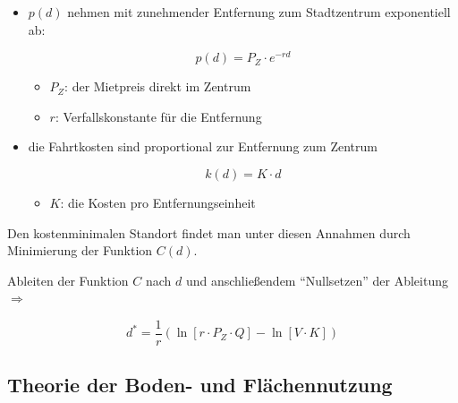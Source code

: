       \begin{itemize}
        \setlength{\itemsep}{1pt}
        \setlength{\parskip}{0pt}
        \setlength{\parsep}{0pt}
        \item $p(d)$ nehmen mit zunehmender Entfernung zum Stadtzentrum exponentiell ab:
          
          \begin{equation}
            p(d) = P_Z \cdot e^{-rd}
          \end{equation}

          \begin{itemize}
            \item $P_Z$: der Mietpreis direkt im Zentrum
            \item $r$: Verfallskonstante für die Entfernung
          \end{itemize}

        \item die Fahrtkosten sind proportional zur Entfernung zum Zentrum

          \begin{equation}
            k(d) = K \cdot d
          \end{equation}

          \begin{itemize}
            \item $K$: die Kosten pro Entfernungseinheit
          \end{itemize}
      \end{itemize}

      \par Den kostenminimalen Standort findet man unter diesen Annahmen durch Minimierung der Funktion $C(d)$.

      \par Ableiten der Funktion $C$ nach $d$ und anschließendem ``Nullsetzen'' der Ableitung $\Rightarrow$

      

      \begin{equation}
        d^* = \frac{1}{r}(\ln[r \cdot P_Z \cdot Q] - \ln[V \cdot K])
      \end{equation}

      \begin{exmp}
        \color{blue}{Aufgabe 1, Aufgabe 2}
      \end{exmp}

    \subsection{Theorie der Boden- und Flächennutzung} %
    \label{sub:theorie_der_boden_und_fla_chennutzung}

